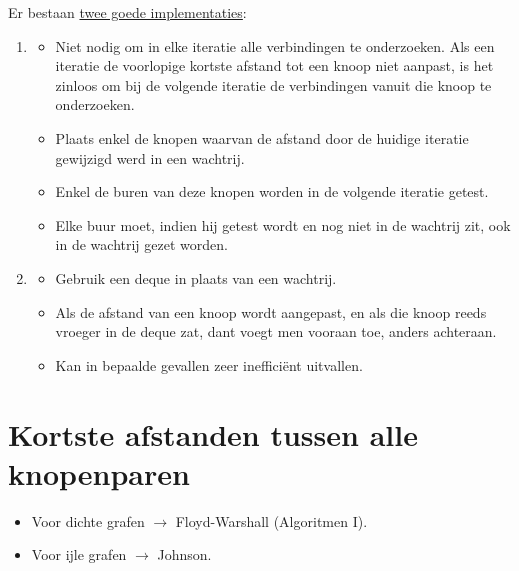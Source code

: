 \documentclass{report}
\begin{document}
Er bestaan \underline{twee goede implementaties}:
\begin{enumerate}
	\item \begin{itemize}
		\item [\info] Niet nodig om in elke iteratie alle verbindingen te onderzoeken. Als een iteratie de voorlopige kortste afstand tot een knoop niet aanpast, is het zinloos om bij de volgende iteratie de verbindingen vanuit die knoop te onderzoeken.
		\item [\info] Plaats enkel de knopen waarvan de afstand door de huidige iteratie gewijzigd werd in een wachtrij.
		\item [\info] Enkel de buren van deze knopen worden in de volgende iteratie getest.
		\item [\info] Elke buur moet, indien hij getest wordt en nog niet in de wachtrij zit, ook in de wachtrij gezet worden.
	\end{itemize}
	\item \begin{itemize}
		\item[\info] Gebruik een deque in plaats van een wachtrij.
		\item[\info] Als de afstand van een knoop wordt aangepast, en als die knoop reeds vroeger in de deque zat, dant voegt men vooraan toe, anders achteraan.
		\item[\alert] Kan in bepaalde gevallen zeer inefficiënt uitvallen.
	\end{itemize}

\end{enumerate}

\section{Kortste afstanden tussen alle knopenparen}
\begin{itemize}
	\item[\info] Voor dichte grafen $\rightarrow$ Floyd-Warshall (Algoritmen I).
	\item[\info] Voor ijle grafen $\rightarrow$ Johnson.
\end{itemize}
\end{document}
